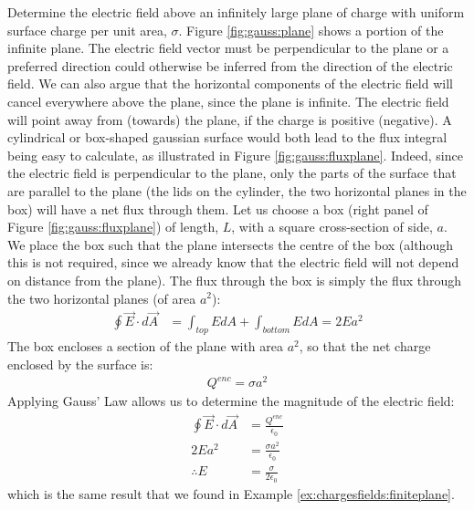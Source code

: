 \begin{example}{Determine the electric field above an infinitely large plane of charge with uniform surface charge per unit area, $\sigma$.} \label{ex:gaus:infiniteplate}
Figure \ref{fig:gauss:plane} shows a portion of the infinite plane. The electric field vector must be perpendicular to the plane or a preferred direction could otherwise be inferred from the direction of the electric field. We can also argue that the horizontal components of the electric field will cancel everywhere above the plane, since the plane is infinite. The electric field will point away from (towards) the plane, if the charge is positive (negative). 
A cylindrical or box-shaped gaussian surface would both lead to the flux integral being easy to calculate, as illustrated in Figure \ref{fig:gauss:fluxplane}. Indeed, since the electric field is perpendicular to the plane, only the parts of the surface that are parallel to the plane (the lids on the cylinder, the two horizontal planes in the box) will have a net flux through them.
Let us choose a box (right panel of Figure \ref{fig:gauss:fluxplane}) of length, $L$, with a square cross-section of side, $a$. We place the box such that the plane intersects the centre of the box (although this is not required, since we already know that the electric field will not depend on distance from the plane). The flux through the box is simply the flux through the two horizontal planes (of area $a^2$):
\begin{align*}
\oint \vec E\cdot d\vec A&= \int_{top} EdA+\int_{bottom}EdA=2Ea^2
\end{align*}
The box encloses a section of the plane with area $a^2$, so that the net charge enclosed by the surface is:
\begin{align*}
Q^{enc}=\sigma a^2
\end{align*}
Applying Gauss' Law allows us to determine the magnitude of the electric field:
\begin{align*}
\oint \vec E\cdot d\vec A&=\frac{Q^{enc}}{\epsilon_0} \\
2Ea^2&= \frac{\sigma a^2}{\epsilon_0}\\
\therefore E&= \frac{\sigma}{2\epsilon_0}
\end{align*}
which is the same result that we found in Example \ref{ex:chargesfields:finiteplane}.


\end{example}

